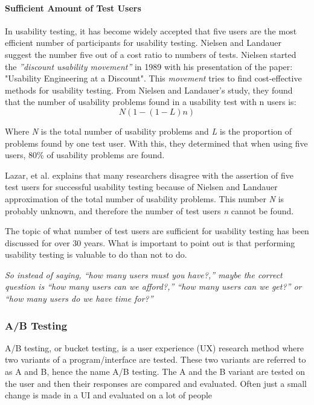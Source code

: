 \paragraph{Sufficient Amount of Test Users}
\label{ssub:Sufficient Amount of Test Users}

In usability testing, it has become widely accepted that five users are the most efficient number of participants for usability testing.  Nielsen and Landauer suggest the number five out of a cost ratio to numbers of tests\cite{nielsen1993mathematical}. Nielsen started the \textit{''discount usability movement''} in 1989 with his presentation of the paper: "Usability Engineering at a Discount"\cite{experienceDiscountUsability20}. This \textit{movement} tries to find cost-effective methods for usability testing. 
From Nielsen and Landauer's study, they found that the number of usability problems found in a usability test with n users is:
\[ N (1-(1- L ) n ) \]

Where \textit{N} is the total number of usability problems and  \textit{L} is the proportion of problems found by one test user. With this, they determined that when using five users, 80\% of usability problems are found.

Lazar, et al. explains that many researchers disagree with the assertion of five test users for successful usability testing because of Nielsen and Landauer approximation of the total number of usability problems\cite[Chapter~10.5.3]{lazar2017research}. This number \textit{N} is probably unknown, and therefore the number of test users \textit{n} cannot be found.

The topic of what number of test users are sufficient for usability testing has been discussed for over 30 years. What is important to point out is that performing usability testing is valuable to do than not to do. 


\textit{
So instead of saying, “how many users must you have?,” maybe the correct question is “how many users can we afford?,” “how many users can we get?” or “how many users do we have time for?”
} \cite{lazar2017research} 








\subsubsection{A/B Testing}%
\label{sub:A/B Testing}
A/B testing, or bucket testing, is a user experience (UX) research method where two variants of a program/interface are tested. These two variants are referred to as A and B, hence the name A/B testing. The A and the B variant are tested on the user and then their responses are compared and evaluated. Often just a small change is made in a UI and evaluated on a lot of people 
 
